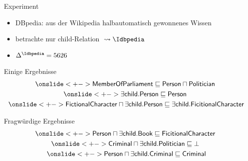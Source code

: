 \documentclass[ngerman]{beamer}
\begin{document}
\begin{frame}

  \onslide<+->
  
  \begin{block}{Experiment}
    \begin{itemize}
    \item<+-> DBpedia: aus der Wikipedia halbautomatisch gewonnenes Wissen
    \item<+-> betrachte nur \textsf{child}-Relation ${} \leadsto \Idbpedia$
    \item<+-> $\Delta^{\Idbpedia} = 5626$
    \end{itemize}
  \end{block}

  \onslide<+->

  \begin{block}{Einige Ergebnisse}
    \vspace*{-3ex}
    \begin{gather*}
      \onslide<+->{\sf MemberOfParliament \sqsubseteq Person \sqcap Politician}~\\
      \onslide<+->{\sf \exists child. Person \sqsubseteq Person}~\\
      \onslide<+->{\sf FictionalCharacter \sqcap \exists child. Person \sqsubseteq \exists
        child. FicitionalCharacter}
    \end{gather*}
  \end{block}

  \onslide<+->

  \vspace*{-3ex}
  \begin{block}{Fragwürdige Ergebnisse}
    \vspace*{-3ex}
    \begin{gather*}
      \onslide<+->{\sf Person \sqcap \exists child. Book \sqsubseteq
        FicitionalCharacter}~\\
      \onslide<+->{\sf Criminal \sqcap \exists child. Politician \sqsubseteq \bot}~\\
      \onslide<+->{\sf Person \sqcap \exists child. Criminal \sqsubseteq Criminal}
    \end{gather*}
  \end{block}

\end{frame}
\end{document}
